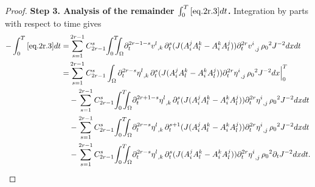 \documentclass[12pt,twoside,reqno]{amsart}
\numberwithin{equation}{section}
\theoremstyle{definition}
\theoremstyle{remark}
\begin{document}
\begin{proof}
\textbf{Step 3. Analysis of the remainder $\int_0^T \eqref{eq.2r.3}dt$.} Integration by parts with respect to time gives
\begin{align}
-\int_0^T \eqref{eq.2r.3}dt
  =&\sum_{s=1}^{2r-1}C_{2r-1}^s{\int_0^T\!\!\!\!\int_\Omega }  {\partial}_t^{2r-1-s}{{{v^l}}_{,{k}}\,}{\partial}_t^s(J(A_i^jA_l^k-A_i^kA_l^j)) {{{{\partial}_t^{2r}v^i}}_{,{j}}\,}{\rho_0}^2  J^{-2}dxdt{\nonumber}\\
  =&\sum_{s=1}^{2r-1}C_{2r-1}^s\int_\Omega {\partial}_t^{2r-s}{{{\eta^l}}_{,{k}}\,}{\partial}_t^s(J(A_i^jA_l^k-A_i^kA_l^j)) {{{{\partial}_t^{2r}\eta^i}}_{,{j}}\,}{\rho_0}^2  J^{-2}dx\Big|_0^T \label{eq.2r.5}\\
  &-\sum_{s=1}^{2r-1}C_{2r-1}^s{\int_0^T\!\!\!\!\int_\Omega }  {\partial}_t^{2r+1-s}{{{\eta^l}}_{,{k}}\,}{\partial}_t^s(J(A_i^jA_l^k-A_i^kA_l^j)) {{{{\partial}_t^{2r}\eta^i}}_{,{j}}\,}{\rho_0}^2  J^{-2}dxdt\label{eq.2r.6}\\
  &-\sum_{s=1}^{2r-1}C_{2r-1}^s{\int_0^T\!\!\!\!\int_\Omega }  {\partial}_t^{2r-s}{{{\eta^l}}_{,{k}}\,}{\partial}_t^{s+1}(J(A_i^jA_l^k-A_i^kA_l^j)) {{{{\partial}_t^{2r}\eta^i}}_{,{j}}\,}{\rho_0}^2  J^{-2}dxdt\label{eq.2r.7}\\
  &-\sum_{s=1}^{2r-1}C_{2r-1}^s{\int_0^T\!\!\!\!\int_\Omega }  {\partial}_t^{2r-s}{{{\eta^l}}_{,{k}}\,}{\partial}_t^{s}(J(A_i^jA_l^k-A_i^kA_l^j)) {{{{\partial}_t^{2r}\eta^i}}_{,{j}}\,}{\rho_0}^2  {\partial}_tJ^{-2}dxdt.\label{eq.2r.8}
\end{align}


\end{proof}
\end{document}
